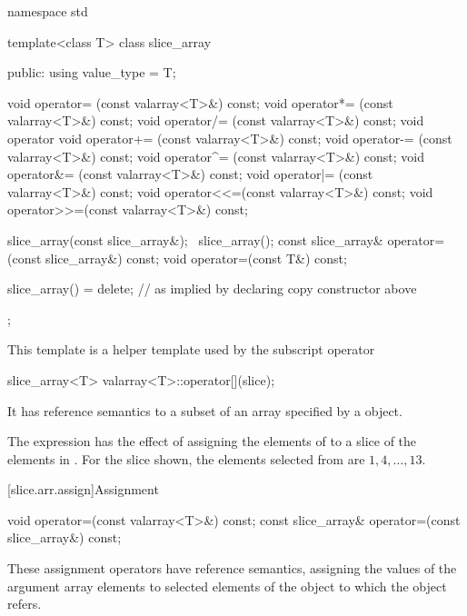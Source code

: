 %
%
\begin{codeblock}
namespace std {
  template<class T> class slice_array {
  public:
    using value_type = T;

    void operator=  (const valarray<T>&) const;
    void operator*= (const valarray<T>&) const;
    void operator/= (const valarray<T>&) const;
    void operator%
    void operator+= (const valarray<T>&) const;
    void operator-= (const valarray<T>&) const;
    void operator^= (const valarray<T>&) const;
    void operator&= (const valarray<T>&) const;
    void operator|= (const valarray<T>&) const;
    void operator<<=(const valarray<T>&) const;
    void operator>>=(const valarray<T>&) const;

    slice_array(const slice_array&);
    ~slice_array();
    const slice_array& operator=(const slice_array&) const;
    void operator=(const T&) const;

    slice_array() = delete;     // as implied by declaring copy constructor above
  };
}
\end{codeblock}

\pnum
This template is a helper template used by the
 subscript operator
\begin{codeblock}
slice_array<T> valarray<T>::operator[](slice);
\end{codeblock}

\pnum
It has reference semantics to a subset of an array specified by a
object.
\begin{example}
The expression
has the effect of assigning the elements of
to a slice of the elements in
.
For the slice shown, the elements
selected from
are $1, 4, \dotsc, 13$.
\end{example}

[slice.arr.assign]{Assignment}

%
\begin{itemdecl}
void operator=(const valarray<T>&) const;
const slice_array& operator=(const slice_array&) const;
\end{itemdecl}

\begin{itemdescr}
\pnum
These assignment operators have reference semantics,
assigning the values of the argument array elements to selected
elements of the
object to which the
object refers.
\end{itemdescr}

